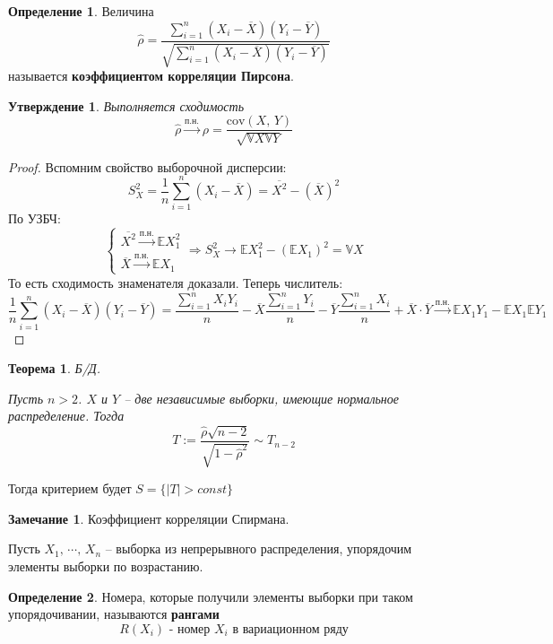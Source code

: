 \documentclass[a4paper,12pt]{article}
\theoremstyle{plain}
\newtheorem{theorem}{Теорема}[section]
\newtheorem{proposition}{Утверждение}[section]
\theoremstyle{definition}
\newtheorem{definition}{Определение}[section]
\newtheorem*{note}{Замечание}
\theoremstyle{remark}
\begin{document}
\begin{definition}
  Величина
  \[
    \hat{\rho} = \frac{\sum_{i = 1}^n(X_i - \overline{X})(Y_i - \overline{Y})}{\sqrt{\sum_{i = 1}^n(X_i - \overline{X})(Y_i - \overline{Y})}}
  \]
  называется \textbf{коэффициентом корреляции Пирсона}.
\end{definition}

\begin{proposition}
  Выполняется сходимость
  \[
    \hat{\rho} \overset{\text{п.н.}}{\to} \rho = \frac{\text{cov}(X,\,Y)}{\sqrt{\mathbb{V}X\mathbb{V}Y}}
  \]
\end{proposition}

\begin{proof}
  Вспомним свойство выборочной дисперсии:
  \[
    S_X^2 = \frac{1}{n}\sum_{i = 1}^n(X_i - \overline{X}) = \overline{X^2} - (\overline{X})^2
  \]
  По УЗБЧ:
  \[
    \begin{cases}
      \overline{X^2} \overset{\text{п.н.}}{\to} \mathbb{E}X_1^2\\
      \overline{X} \overset{\text{п.н.}}{\to} \mathbb{E}X_1
    \end{cases} \Rightarrow S_X^2 \to \mathbb{E}X_1^2 - (\mathbb{E}X_1)^2 = \mathbb{V}X
  \]
  То есть сходимость знаменателя доказали. Теперь числитель:
  \[
    \frac{1}{n}\sum_{i = 1}^n(X_i - \overline{X})(Y_i - \overline{Y}) = \frac{\sum_{i=1}^nX_iY_i}{n} - \overline{X}\frac{\sum_{i = 1}^nY_i}{n} - \overline{Y}\frac{\sum_{i = 1}^nX_i}{n} + \overline{X}\cdot\overline{Y} \overset{\text{п.н.}}{\to} \mathbb{E}X_1Y_1 - \mathbb{E}X_1\mathbb{E}Y_1
  \]
\end{proof}

\begin{theorem}
  Б/Д.

  Пусть $n > 2$. $X$ и $Y$ -- две независимые выборки, имеющие нормальное распределение. Тогда
  \[
    T := \frac{\hat{\rho}\sqrt{n - 2}}{\sqrt{1 - \hat{\rho}^2}} \sim T_{n - 2}
  \]
\end{theorem}

Тогда критерием будет $S = \{\vert T\vert > const\}$

\begin{note}
  Коэффициент корреляции Спирмана.

  Пусть $X_1,\,\cdots,\,X_n$ -- выборка из непрерывного распределения, упорядочим элементы выборки по возрастанию.
\end{note}

\begin{definition}
  Номера, которые получили элементы выборки при таком упорядочивании, называются \textbf{рангами}
  \[
    R(X_i) \text{ - номер }X_i\text{ в вариационном ряду}
  \]
\end{definition}
\end{document}
